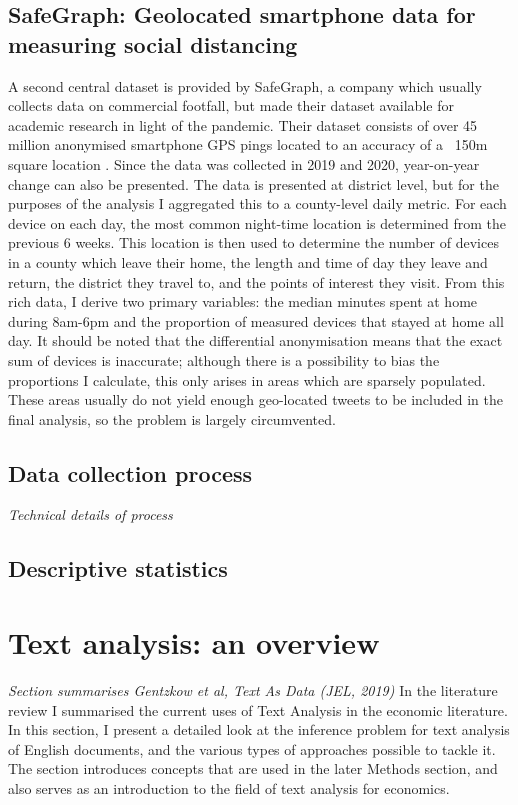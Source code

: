 \documentclass{article}
\begin{document}
\subsection{SafeGraph: Geolocated smartphone data for measuring social distancing}
A second central dataset is provided by SafeGraph, a company which usually collects data on commercial footfall, but made their dataset available for academic research in light of the pandemic. Their dataset consists of over 45 million anonymised smartphone GPS pings located to an accuracy of a ~150m square location \parencite{safegraphinc.SocialDistancingMetrics2020}. Since the data was collected in 2019 and 2020, year-on-year change can also be presented. The data is presented at district level, but for the purposes of the analysis I aggregated this to a county-level daily metric. For each device on each day, the most common night-time location is determined from the previous 6 weeks. This location is then used to determine the number of devices in a county which leave their home, the length and time of day they leave and return, the district they travel to, and the points of interest they visit.  From this rich data, I derive two primary variables: the median minutes spent at home during 8am-6pm and the proportion of measured devices that stayed at home all day. It should be noted that the differential anonymisation means that the exact sum of devices is inaccurate; although there is a possibility to bias the proportions I calculate, this only arises in areas which are sparsely populated. These areas usually do not yield enough geo-located tweets to be included in the final analysis, so the problem is largely circumvented.

\subsection{Data collection process}
\textit{Technical details of process}

\subsection{Descriptive statistics}

\section{Text analysis: an overview}\label{textan}
\textit{Section summarises Gentzkow et al, Text As Data (JEL, 2019)}
In the literature review I summarised the current uses of Text Analysis in the economic literature. In this section, I present a detailed look at the inference problem for text analysis of English documents, and the various types of approaches possible to tackle it. The section introduces concepts that are used in the later Methods section, and also serves as an introduction to the field of text analysis for economics.
\end{document}
